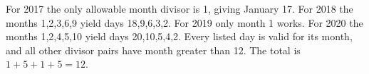 For 2017 the only allowable month divisor is 1, giving January 17. For 2018 the months 1,2,3,6,9 yield days 18,9,6,3,2. For 2019 only month 1 works. For 2020 the months 1,2,4,5,10 yield days 20,10,5,4,2. Every listed day is valid for its month, and all other divisor pairs have month greater than 12. The total is $1+5+1+5=\boxed{12}$.
